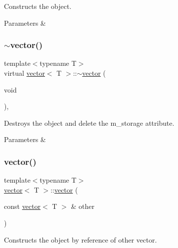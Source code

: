 Constructs the object. 


\begin{DoxyParams}{Parameters}
{\em } & \\
\hline
\end{DoxyParams}
\mbox{\label{classvector_a260a8b82458c2ce9233d1f5cb9c82e4a}} 
\subsubsection{\texorpdfstring{$\sim$vector()}{~vector()}}
{\footnotesize\ttfamily template$<$typename T$>$ \\
virtual \hyperlink{classvector}{vector}$<$ T $>$\+::$\sim$\hyperlink{classvector}{vector} (\begin{DoxyParamCaption}\item[{void}]{ }\end{DoxyParamCaption})\hspace{0.3cm}{\ttfamily [inline]}, {\ttfamily [virtual]}}



Destroys the object and delete the m\+\_\+storage attribute. 


\begin{DoxyParams}{Parameters}
{\em } & \\
\hline
\end{DoxyParams}
\mbox{\label{classvector_a9b9494209da81c872941f58ae482dab6}} 
\subsubsection{\texorpdfstring{vector()}{vector()}\hspace{0.1cm}{\footnotesize\ttfamily [3/6]}}
{\footnotesize\ttfamily template$<$typename T$>$ \\
\hyperlink{classvector}{vector}$<$ T $>$\+::\hyperlink{classvector}{vector} (\begin{DoxyParamCaption}\item[{const \hyperlink{classvector}{vector}$<$ T $>$ \&}]{other }\end{DoxyParamCaption})\hspace{0.3cm}{\ttfamily [inline]}}



Constructs the object by reference of other vector. 


